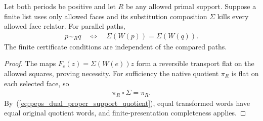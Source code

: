 \begin{lemma}
    \label{lem:peps_dual_face_certificate_classification}
    \leanok
    Let both periods be positive and let $R$ be any allowed primal support.
    Suppose a finite list uses only allowed faces and its substitution
    composition $\Sigma$ kills every allowed face relator. For parallel paths,
    \begin{align}
        p\sim_Rq\quad\Longleftrightarrow\quad\Sigma(W(p))=\Sigma(W(q)).
        \label{eq:peps_dual_face_certificate_classification}
    \end{align}
    The finite certificate conditions are independent of the compared paths.
\end{lemma}
\begin{proof}\leanok
    The maps $F_e(z)=\Sigma(W(e))z$ form a reversible transport flat on the
    allowed squares, proving necessity. For sufficiency the native quotient
    $\pi_R$ is flat on each selected face, so
    \begin{align}
        \pi_R\circ\Sigma=\pi_R.
        \label{eq:peps_dual_proper_support_quotient}
    \end{align}
    By~(\ref{eq:peps_dual_proper_support_quotient}), equal transformed words
    have equal original quotient words, and finite-presentation completeness
    applies.
\end{proof}

